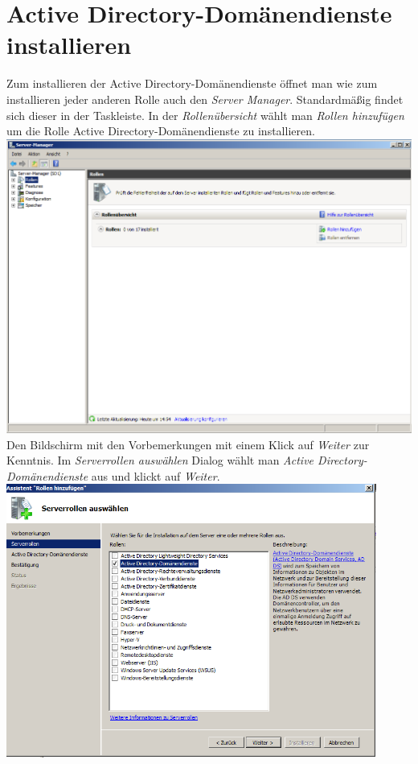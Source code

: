\documentclass[12pt,a4paper,titlepage]{article} %
\begin{document}
\newpage
\section{Active Directory-Domänendienste installieren}
Zum installieren der Active Directory-Domänendienste öffnet man wie zum installieren jeder anderen Rolle auch den \emph{Server Manager}. Standardmäßig findet sich dieser in der Taskleiste. In der \emph{Rollenübersicht} wählt man \emph{Rollen hinzufügen} um die Rolle Active Directory-Domänendienste zu installieren.\\

	\includegraphics[width=14cm]{Bilder/006}\\
	
Den Bildschirm mit den Vorbemerkungen mit einem Klick auf \emph{Weiter} zur Kenntnis. Im \emph{Serverrollen auswählen} Dialog wählt man \emph{Active Directory-Domänendienste} aus und klickt auf \emph{Weiter}.\\

	\includegraphics[height=9cm]{Bilder/008}\\
	
\end{document}
